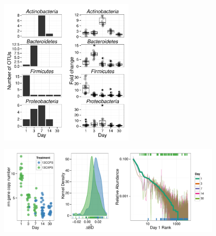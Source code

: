 \begin{figure}[H]
	\begin{center}
	\centerline{\includegraphics[width=0.6\textwidth]{figures/xylose_rspndr_bar/xylose_rspndr_bar.pdf}}
	\caption{\protect}\label{fig:xyl_count}
        \end{center}
\end{figure}

\begin{figure}[H]
	\begin{center}
	\centerline{\includegraphics[width=15.4cm]{figures/shift_and_rabund3/shift_and_rabund.pdf}}
	\caption{\protect}\label{fig:shift}
    \end{center}
\end{figure}


\restoregeometry
